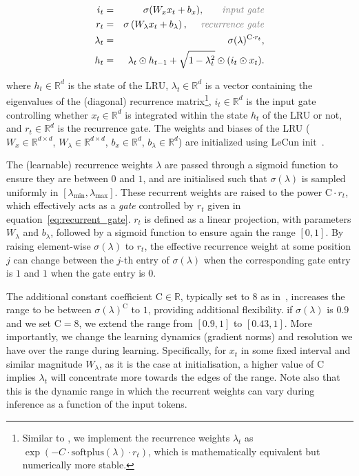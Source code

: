 \begin{eqnarray}
i_t & = & \sigma(W_x x_t + b_x), \quad\,\,\, \textcolor{gray}{\text{\emph{ input gate}}} \label{eq:input_gate}\\
r_t &=& \sigma\left(W_\lambda x_t + b_\lambda\right), \quad \textcolor{gray}{\text{ \emph{recurrence gate}}} \label{eq:recurrent_gate} \\
\lambda_t &=& \sigma(\lambda)^{\text{C} \cdot r_t}, \label{eq:a_rglru} \\
h_{t} &=& \lambda_t \odot h_{t-1} + \sqrt{1-\lambda_t^2} \odot (i_t \odot x_t).
\label{eq:RG_LRU}
\end{eqnarray}


\noindent where $h_t \in \mathbb{R}^d$ is the state of the LRU, $\lambda_t\in \mathbb{R}^d$ is a vector containing the eigenvalues of the (diagonal) recurrence matrix\footnote{Similar to \cite{de2024griffinmixinggatedlinear}, we implement the recurrence weights $\lambda_t$ as ${\exp(-C\cdot \text{softplus}(\lambda)\cdot r_t)}$, which is mathematically equivalent but numerically more stable.}, $i_t \in \mathbb{R}^d$ is the input gate controlling whether $x_t\in \mathbb{R}^d$ is integrated within the state $h_t$ of the LRU or not, and $r_t\in\mathbb{R}^d$ is the recurrence gate.
The weights and biases of the LRU ($W_x\in \mathbb{R}^{d \times d}$, $W_\lambda \in \mathbb{R}^{d \times d}$, $b_x \in \mathbb{R}^d$, $b_\lambda \in \mathbb{R}^d$) are initialized using LeCun init~\cite{LeCun2012}. 

The (learnable) recurrence weights $\lambda$ are passed through a sigmoid function to ensure they are between $0$ and $1$, and are initialised such that $\sigma(\lambda)$ is sampled uniformly in $[\lambda_{\min}, \lambda_{\max}]$. These recurrent weights are raised to the power $\text{C} \cdot r_t$, which effectively acts as a \emph{gate} controlled by $r_t$ given in equation~\eqref{eq:recurrent_gate}. $r_t$ is defined as a linear projection, with parameters $W_\lambda$ and $b_\lambda$, followed by a sigmoid function to ensure again the range $[0,1]$. By raising element-wise $\sigma(\lambda)$ to $r_t$, the effective recurrence weight at some position $j$ can change between the $j$-th entry of $\sigma(\lambda)$ when the corresponding gate entry is $1$ and $1$ when the gate entry is 0. 

The additional constant coefficient $\text{C}\in \mathbb{R}$, typically set to 8 as in~\cite{de2024griffinmixinggatedlinear}, increases the range to be between $\sigma(\lambda)^\text{C}$ to $1$, providing additional flexibility. \Eg if $\sigma(\lambda)$ is $0.9$ and we set $\text{C}=8$, we extend the range from $[0.9, 1]$ to $[0.43, 1]$. More importantly, we change the learning dynamics (\eg gradient norms) and resolution we have over the range during learning. Specifically, for $x_t$ in some fixed interval and similar magnitude $W_\lambda$, as it is the case at initialisation, a higher value of $\text{C}$ implies $\lambda_t$ will concentrate more towards the edges of the range. Note also that this is the dynamic range in which the recurrent weights can vary during inference as a function of the input tokens. 

